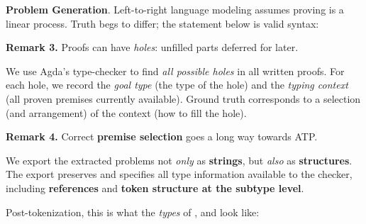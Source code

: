 \documentclass{article}
\newcommand{\sectionfont}{\fontsize{34}{34}\selectfont\setlength{\parskip}{1\baselineskip}}
\newcommand{\nfont}{\fontsize{21}{22}\selectfont\setlength{\parskip}{1\baselineskip}}
\newcommand{\light}[1]{\textcolor{gray!90}{#1}}
\begin{document}
	\begin{minipage}[t]{0.29\textwidth}
	\sectionfont{\textbf{Dataset}}	
	\nfont

	\textbf{Problem Generation}. Left-to-right language modeling assumes proving is a linear process. Truth begs to differ; the statement below is valid syntax:
	\begin{center}\begin{code}%
		\>[0]\AgdaSpace{}%
		\>[16]\AgdaSymbol{(}\AgdaSpace{}%
		\AgdaSymbol{)}%
		\>[25]\AgdaSymbol{=}\AgdaSpace{}%
		\AgdaHole{\{!!\}}\<%
	\end{code}\end{center}

	\vspace{-0.5\parskip}
	\hfill\begin{minipage}{0.95\textwidth}
	\light{\textbf{Remark 3.} Proofs can have \textit{holes}: unfilled parts deferred for later. \emoji{cheese}}
	\end{minipage}
	
	We use Agda's type-checker to find \textit{all possible holes} in all written proofs. For each hole, we record the \textit{goal type} (the type of the hole) and the \textit{typing context} (all proven premises currently available). Ground truth corresponds to a selection (and arrangement) of the context (how to fill the hole).
	
	\vspace{-0.5\parskip}
	\hfill\begin{minipage}{0.95\textwidth}
	\light{\textbf{Remark 4.} Correct \textbf{premise selection} goes a long way towards ATP. \emoji{jigsaw}}
	\end{minipage}
	
	We export the extracted problems not \textit{only} as \textbf{strings}, but \textit{also} as \textbf{structures}.\linebreak
	The export preserves and specifies all type information available to the checker, including \textbf{references} and \textbf{token structure at the subtype level}.
	
	
	Post-tokenization, this is what the \textit{types} of , \AgdaFunction{$+$} and  look like:
	

\end{minipage}
\end{document}
